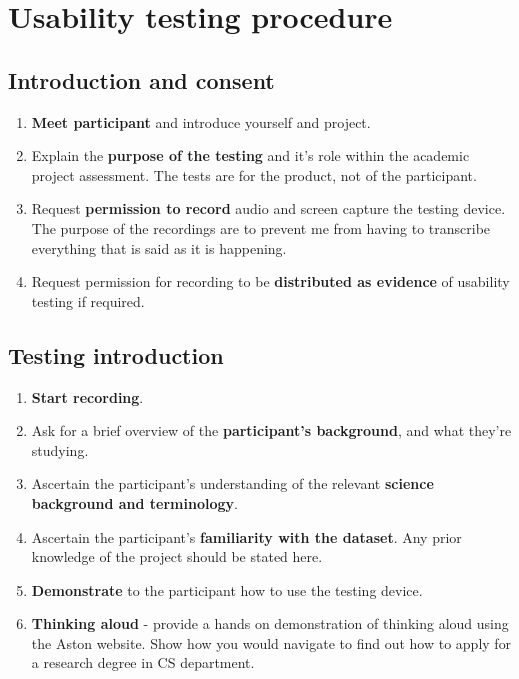 \chapter{Usability testing procedure}\label{app:evaluation-script}

\section*{Introduction and consent}
\begin{enumerate}
\item \textbf{Meet participant} and introduce yourself and project.
\item Explain the \textbf{purpose of the testing} and it's role within
  the academic project assessment. The tests are for the product, not
  of the participant.
\item Request \textbf{permission to record} audio and screen capture
  the testing device. The purpose of the recordings are to prevent me
  from having to transcribe everything that is said as it is
  happening.
\item Request permission for recording to be \textbf{distributed as
  evidence} of usability testing if required.
\end{enumerate}

\section*{Testing introduction}
\begin{enumerate}
\item \textbf{Start recording}.
\item Ask for a brief overview of the \textbf{participant's
  background}, and what they're studying.
\item Ascertain the participant's understanding of the relevant
  \textbf{science background and terminology}.
\item Ascertain the participant's \textbf{familiarity with the
  dataset}. Any prior knowledge of the project should be stated here.
\item \textbf{Demonstrate} to the participant how to use the testing
  device.
\item \textbf{Thinking aloud} - provide a hands on demonstration of
  thinking aloud using the Aston website. Show how you would navigate
  to find out how to apply for a research degree in CS department.
\end{enumerate}

\newpage

